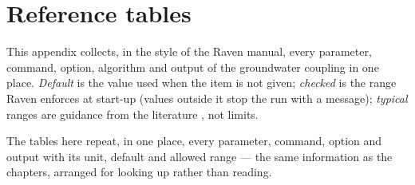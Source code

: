 \chapter{Reference tables}\label{app:tables}
This appendix collects, in the style of the Raven manual, every parameter, command, option, algorithm and output of the
groundwater coupling in one place. \emph{Default} is the value used when the item is not given; \emph{checked} is the range
Raven enforces at start-up (values outside it stop the run with a message); \emph{typical} ranges are guidance from the
literature \cite{freeze1979groundwater,domenico1998physical,johnson1967specific,calver2001riverbed}, not limits.

\begin{plain}
The tables here repeat, in one place, every parameter, command, option and output with its unit, default and allowed range
--- the same information as the chapters, arranged for looking up rather than reading.
\end{plain}

